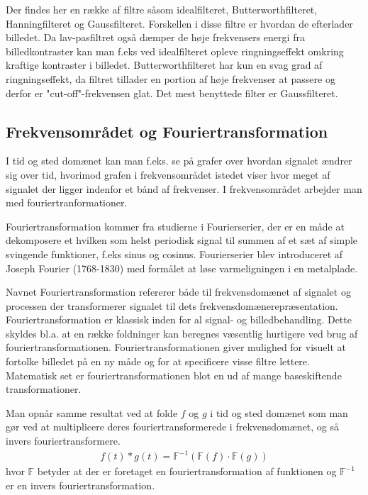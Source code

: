 Der findes her en række af filtre såsom idealfilteret, Butterworthfilteret, Hanningfilteret og Gaussfilteret. Forskellen i disse filtre er hvordan de efterlader billedet. Da lav-pasfiltret også dæmper de høje frekvensers energi fra billedkontraster kan man f.eks ved idealfilteret opleve ringningseffekt omkring kraftige kontraster i billedet. Butterworthfilteret har kun en svag grad af ringningseffekt, da filtret tillader en portion af høje frekvenser at passere og derfor er "cut-off"-frekvensen glat. Det mest benyttede filter er Gaussfilteret.

\subsection{Frekvensområdet og Fouriertransformation}
I tid og sted domænet kan man f.eks. se på grafer over hvordan signalet ændrer sig over tid, hvorimod grafen i frekvensområdet istedet viser hvor meget af signalet der ligger indenfor et bånd af frekvenser. I frekvensområdet arbejder man med fouriertranformationer\cite{freq}.

Fouriertransformation kommer fra studierne i Fourierserier, der er en måde at dekomposere et hvilken som helst periodisk signal til summen af et sæt af simple svingende funktioner, f.eks sinus og cosinus. Fourierserier blev introduceret af Joseph Fourier (1768-1830) med formålet at løse varmeligningen i en metalplade.

Navnet Fouriertransformation refererer både til frekvensdomænet af signalet og processen der transformerer signalet til dets frekvensdomænerepræsentation. Fouriertransformation er klassisk inden for al signal- og billedbehandling. Dette skyldes bl.a. at en række foldninger kan beregnes væsentlig hurtigere ved brug af fouriertransformationen. Fouriertransformationen giver mulighed for visuelt at fortolke billedet på en ny måde og for at specificere visse filtre lettere. Matematisk set er fouriertransformationen blot en ud af mange baseskiftende transformationer.

Man opnår samme resultat ved at folde $f$ og $g$ i tid og sted domænet som man gør ved at multiplicere deres fouriertransformerede i frekvensdomænet, og så invers fouriertransformere.
\begin{align}
	f(t)*g(t) = \mathbb{F}^{-1}(\mathbb{F}(f)\cdot\mathbb{F}(g))
\end{align}
hvor $\mathbb{F}$ betyder at der er foretaget en fouriertransformation af funktionen og $\mathbb{F}^{-1}$ er en invers fouriertransformation.

 

